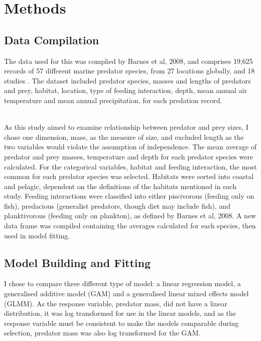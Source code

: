 \documentclass[11pt,a4paper]{article}
\begin{document}
	\section{Methods}
	
	\subsection{Data Compilation}
	
	\par \noindent The data used for this was complied by Barnes et al, 2008, and comprises 19,625 records of 57 different marine predator species, from 27 locations globally, and 18 studies \citep{Barnes2008}. The dataset included predator species, masses and lengths of predators and prey, habitat, location, type of feeding interaction, depth, mean annual air temperature and mean annual precipitation, for each predation record.
	
	\par \noindent ~\\As this study aimed to examine relationship between predator and prey sizes, I chose one dimension, mass, as the measure of size, and excluded length as the two variables would violate the assumption of independence. The mean average of predator and prey masses, temperature and depth for each predator species were calculated. For the categorical variables, habitat and feeding interaction, the most common for each predator species was selected. Habitats were sorted into coastal and pelagic, dependent on the definitions of the habitats mentioned in each study. Feeding interactions were classified into either piscivorous (feeding only on fish), predacious (generalist predators, though diet may include fish), and planktivorous (feeding only on plankton), as defined by Barnes et al, 2008. A new data frame was compiled containing the averages calculated for each species, then used in model fitting.
	
	\subsection{Model Building and Fitting}
	
	\par \noindent I chose to compare three different type of model: a linear regression model, a generalised additive model (GAM) and a generalised linear mixed effects model (GLMM). As the response variable, predator mass, did not have a linear distribution, it was log transformed for use in the linear models, and as the response variable must be consistent to make the models comparable during selection, predator mass was also log transformed for the GAM.
	
\end{document}
